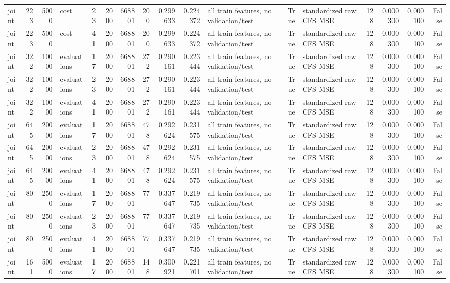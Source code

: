 \begin{tabular}{lrrlrrrrrrlrlrrrr}
joint & 223 & 5000 & cost & 23 & 2000 & 668801 & 200 & 0.299633 & 0.224372 & all train features, no validation/test & True & standardized raw CFS MSE & 128 & 0.000300 & 0.000100 & False \\
joint & 223 & 5000 & cost & 41 & 2000 & 668801 & 200 & 0.299633 & 0.224372 & all train features, no validation/test & True & standardized raw CFS MSE & 128 & 0.000300 & 0.000100 & False \\
joint & 322 & 10000 & evaluations & 17 & 2000 & 668801 & 272 & 0.290161 & 0.223444 & all train features, no validation/test & True & standardized raw CFS MSE & 128 & 0.000300 & 0.000100 & False \\
joint & 322 & 10000 & evaluations & 23 & 2000 & 668801 & 272 & 0.290161 & 0.223444 & all train features, no validation/test & True & standardized raw CFS MSE & 128 & 0.000300 & 0.000100 & False \\
joint & 322 & 10000 & evaluations & 41 & 2000 & 668801 & 272 & 0.290161 & 0.223444 & all train features, no validation/test & True & standardized raw CFS MSE & 128 & 0.000300 & 0.000100 & False \\
joint & 645 & 20000 & evaluations & 17 & 2000 & 668801 & 478 & 0.292624 & 0.231575 & all train features, no validation/test & True & standardized raw CFS MSE & 128 & 0.000300 & 0.000100 & False \\
joint & 645 & 20000 & evaluations & 23 & 2000 & 668801 & 478 & 0.292624 & 0.231575 & all train features, no validation/test & True & standardized raw CFS MSE & 128 & 0.000300 & 0.000100 & False \\
joint & 645 & 20000 & evaluations & 41 & 2000 & 668801 & 478 & 0.292624 & 0.231575 & all train features, no validation/test & True & standardized raw CFS MSE & 128 & 0.000300 & 0.000100 & False \\
joint & 80 & 2500 & evaluations & 17 & 2000 & 668801 & 77 & 0.337647 & 0.219735 & all train features, no validation/test & True & standardized raw CFS MSE & 128 & 0.000300 & 0.000100 & False \\
joint & 80 & 2500 & evaluations & 23 & 2000 & 668801 & 77 & 0.337647 & 0.219735 & all train features, no validation/test & True & standardized raw CFS MSE & 128 & 0.000300 & 0.000100 & False \\
joint & 80 & 2500 & evaluations & 41 & 2000 & 668801 & 77 & 0.337647 & 0.219735 & all train features, no validation/test & True & standardized raw CFS MSE & 128 & 0.000300 & 0.000100 & False \\
joint & 161 & 5000 & evaluations & 17 & 2000 & 668801 & 148 & 0.300921 & 0.221701 & all train features, no validation/test & True & standardized raw CFS MSE & 128 & 0.000300 & 0.000100 & False \\

\end{tabular}
